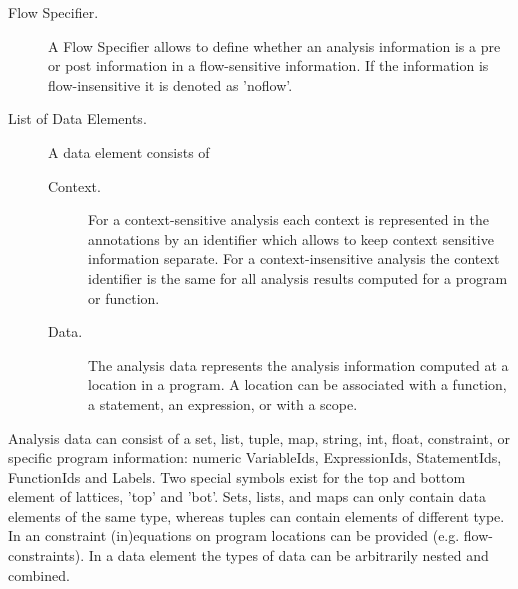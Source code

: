 \begin{description}
\begin{description}
\begin{description}
\item [Flow Specifier.] A Flow Specifier allows to define whether an analysis information is a pre or post information in a flow-sensitive information. If the information is flow-insensitive it is denoted as 'noflow'.
\item [List of Data Elements.] A data element consists of
\begin{description}
\item [Context.] For a context-sensitive analysis each context is represented in the annotations by an identifier which allows to keep context sensitive information separate. For a context-insensitive analysis the context identifier is the same for all analysis results computed for a program or function.
\item [Data.] The analysis data represents the analysis
information computed at a location in a program. A location can be
associated with a function, a statement, an expression, or with a scope.
\end{description}
\end{description}
\end{description}

Analysis data can consist of a set, list, tuple, map, string, int, float,
constraint, or specific program information: numeric VariableIds,
ExpressionIds, StatementIds, FunctionIds and Labels. Two special
symbols exist for the top and bottom element of lattices, 'top' and 'bot'. Sets, lists,
and maps can only contain data elements of the same type, whereas
tuples can contain elements of different type. In an constraint
(in)equations on program locations can be provided
(e.g. flow-constraints). In a data element the types of data can be
arbitrarily nested and combined.
\end{description}


